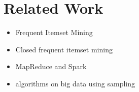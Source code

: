 \section{Related Work}
\label{sec:related}

\begin{itemize}
  \item Frequent Itemset Mining
  \item Closed frequent itemset mining
  \item MapReduce and Spark
  \item algorithms on big data using sampling
\end{itemize}
